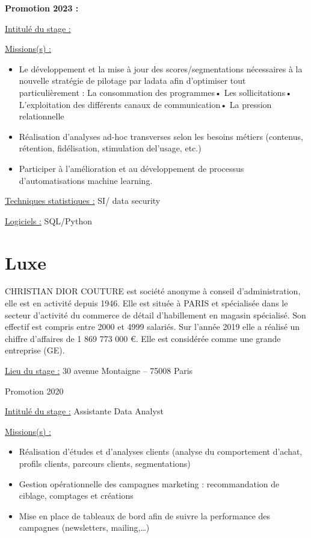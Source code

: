 \documentclass[
  letterpaper,
  DIV=11,
  numbers=noendperiod]{scrreprt}
\providecommand{\tightlist}{%
  \setlength{\itemsep}{0pt}\setlength{\parskip}{0pt}}\usepackage{longtable,booktabs,array}
\begin{document}
\textbf{Promotion 2023 :}

\uline{Intitulé du stage :}

\uline{Missions(s) :}

\begin{itemize}
\tightlist
\item
  Le développement et la mise à jour des scores/segmentations
  nécessaires à la nouvelle stratégie de pilotage par ladata afin
  d'optimiser tout particulièrement : La consommation des programmes•
  Les sollicitations• L'exploitation des différents canaux de
  communication• La pression relationnelle
\item
  Réalisation d'analyses ad-hoc transverses selon les besoins métiers
  (contenus, rétention, fidélisation, stimulation del'usage, etc.)
\item
  Participer à l'amélioration et au développement de processus
  d'automatisations machine learning.
\end{itemize}

\uline{Techniques statistiques :} SI/ data security

\uline{Logiciels :} SQL/Python


\hypertarget{luxe}{%
\chapter{Luxe}\label{luxe}}

CHRISTIAN DIOR COUTURE est société anonyme à conseil d'administration,
elle est en activité depuis 1946. Elle est située à PARIS et spécialisée
dans le secteur d'activité du commerce de détail d'habillement en
magasin spécialisé. Son effectif est compris entre 2000 et 4999
salariés. Sur l'année 2019 elle a réalisé un chiffre d'affaires de 1 869
773 000 €. Elle est considérée comme une grande entreprise (GE).

\uline{Lieu du stage :} 30 avenue Montaigne -- 75008 Paris

Promotion 2020

\uline{Intitulé du stage :} Assistante Data Analyst

\uline{Missions(s) :}

\begin{itemize}
\item
  Réalisation d'études et d'analyses clients (analyse du comportement
  d'achat, profils clients, parcours clients, segmentations)
\item
  Gestion opérationnelle des campagnes marketing : recommandation de
  ciblage, comptages et créations
\item
  Mise en place de tableaux de bord afin de suivre la performance des
  campagnes (newsletters, mailing,\ldots)
\end{itemize}
\end{document}
